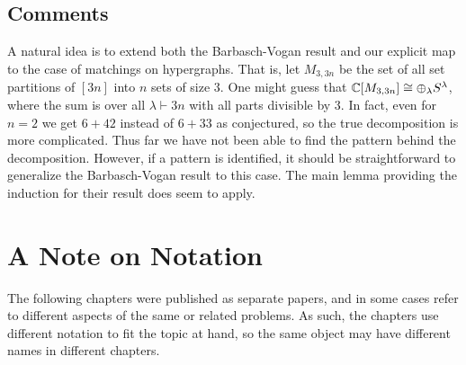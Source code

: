 \subsection{Comments}
A natural idea is to extend both the Barbasch-Vogan result and our explicit map to the case of matchings on hypergraphs.
That is, let $M_{3,3n}$ be the set of all set partitions of $[3n]$ into $n$ sets of size $3$.
One might guess that $\mathbb{C}[M_{3,3n}] \cong \oplus_\lambda S^\lambda$, where the sum is over all $\lambda \vdash 3n$ with all parts divisible by 3.
In fact, even for $n=2$ we get $6+42$ instead of $6+33$ as conjectured, so the true decomposition is more complicated.
Thus far we have not been able to find the pattern behind the decomposition.
However, if a pattern is identified, it should be straightforward to generalize the Barbasch-Vogan result to this case.
The main lemma providing the induction for their result does seem to apply.

\section{A Note on Notation}
The following chapters were published as separate papers, and in some cases refer to different aspects of the same or related problems. 
As such, the chapters use different notation to fit the topic at hand, so the same object may have different names in different chapters.

